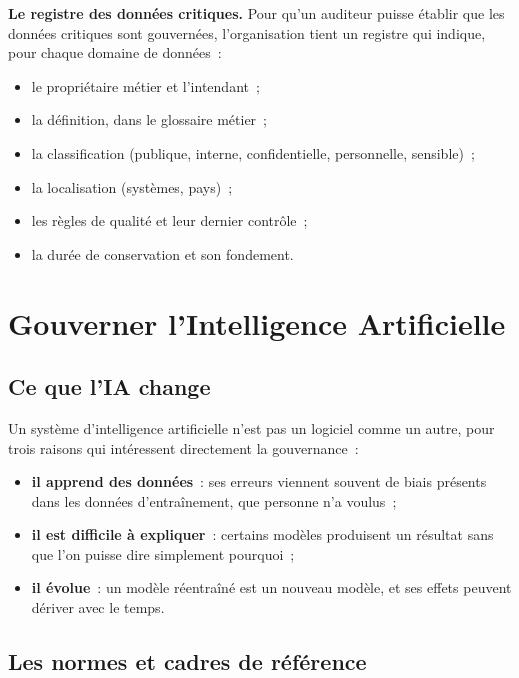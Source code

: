 \begin{boxprocedure}
\textbf{Le registre des données critiques.} Pour qu'un auditeur puisse
établir que les données critiques sont gouvernées, l'organisation tient
un registre qui indique, pour chaque domaine de données~:
\begin{itemize}
    \item le propriétaire métier et l'intendant~;
    \item la définition, dans le glossaire métier~;
    \item la classification (publique, interne, confidentielle,
          personnelle, sensible)~;
    \item la localisation (systèmes, pays)~;
    \item les règles de qualité et leur dernier contrôle~;
    \item la durée de conservation et son fondement.
\end{itemize}
\end{boxprocedure}

\section{Gouverner l'Intelligence Artificielle}
\label{sec:c19-ia}

\subsection{Ce que l'IA change}

Un système d'intelligence artificielle n'est pas un logiciel comme un
autre, pour trois raisons qui intéressent directement la gouvernance~:
\begin{itemize}
    \item \textbf{il apprend des données}~: ses erreurs viennent souvent de
          biais présents dans les données d'entraînement, que personne n'a
          voulus~;
    \item \textbf{il est difficile à expliquer}~: certains modèles
          produisent un résultat sans que l'on puisse dire simplement
          pourquoi~;
    \item \textbf{il évolue}~: un modèle réentraîné est un nouveau modèle,
          et ses effets peuvent dériver avec le temps.
\end{itemize}

\subsection{Les normes et cadres de référence}

